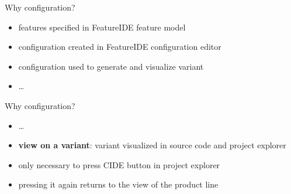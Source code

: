 \begin{frame}{\myframetitle\mysource{\cide}}
	\begin{mycolumns}[widths={45},animation=none]
		\begin{example}{Why configuration?}
			\begin{itemize}
				\item features specified in FeatureIDE feature model
				\item configuration created in FeatureIDE configuration editor
				\item configuration used to generate and visualize variant
				\item \ldots
			\end{itemize}
		\end{example}
	\mynextcolumn
	\end{mycolumns}
\end{frame}

\begin{frame}{\myframetitle\mysource{\cide}}
	\begin{mycolumns}[widths={45},animation=none]
		\begin{example}{Why configuration?}
			\begin{itemize}
				\item \ldots
				\item \textbf{view on a variant}: variant visualized in source code and project explorer
				\item only necessary to press CIDE button in project explorer
				\item pressing it again returns to the view of the product line
			\end{itemize}
		\end{example}
	\mynextcolumn
	\end{mycolumns}
\end{frame}
